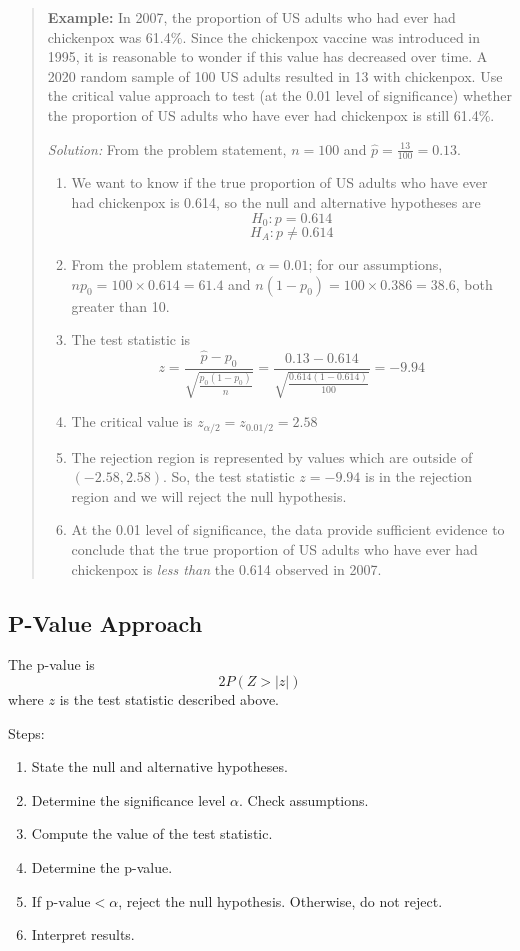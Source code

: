 \documentclass[
]{book}
\providecommand{\tightlist}{%
  \setlength{\itemsep}{0pt}\setlength{\parskip}{0pt}}
\begin{document}
\begin{quote}
\textbf{Example:} In 2007, the proportion of US adults who had ever had chickenpox was 61.4\%. Since the chickenpox vaccine was introduced in 1995, it is reasonable to wonder if this value has decreased over time. A 2020 random sample of 100 US adults resulted in 13 with chickenpox. Use the critical value approach to test (at the 0.01 level of significance) whether the proportion of US adults who have ever had chickenpox is still 61.4\%.

\emph{Solution:} From the problem statement, \(n=100\) and \(\hat{p} = \frac{13}{100} = 0.13\).

\begin{enumerate}
\def\labelenumi{\arabic{enumi}.}
\tightlist
\item
  We want to know if the true proportion of US adults who have ever had chickenpox is 0.614, so the null and alternative hypotheses are \[H_0: p = 0.614\] \[H_A: p \ne 0.614\]
\item
  From the problem statement, \(\alpha = 0.01\); for our assumptions, \(np_0 = 100\times 0.614 = 61.4\) and \(n(1-p_0) = 100\times 0.386 = 38.6\), both greater than 10.
\item
  The test statistic is \[z = \frac{\hat{p} - p_0}{\sqrt{\frac{p_0(1-p_0)}{n}}} = \frac{0.13 - 0.614}{\sqrt{\frac{0.614(1-0.614)}{100}}} = -9.94\]
\item
  The critical value is \(z_{\alpha/2} = z_{0.01/2} = 2.58\)
\item
  The rejection region is represented by values which are outside of \((-2.58, 2.58)\). So, the test statistic \(z = -9.94\) is in the rejection region and we will reject the null hypothesis.
\item
  At the 0.01 level of significance, the data provide sufficient evidence to conclude that the true proportion of US adults who have ever had chickenpox is \emph{less than} the 0.614 observed in 2007.
\end{enumerate}
\end{quote}

\subsection{P-Value Approach}\label{p-value-approach}

The p-value is \[2P(Z > |z|)\] where \(z\) is the test statistic described above.

Steps:

\begin{enumerate}
\def\labelenumi{\arabic{enumi}.}
\tightlist
\item
  State the null and alternative hypotheses.
\item
  Determine the significance level \(\alpha\). Check assumptions.
\item
  Compute the value of the test statistic.
\item
  Determine the p-value.
\item
  If \(\text{p-value} < \alpha\), reject the null hypothesis. Otherwise, do not reject.
\item
  Interpret results.
\end{enumerate}
\end{document}
